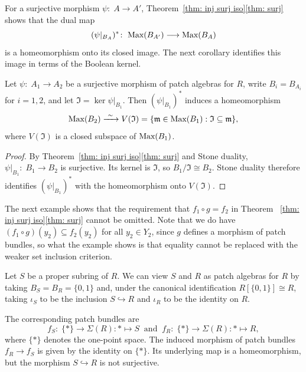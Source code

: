 \documentclass[11pt]{amsart}
\begin{document}
\medskip

For a surjective morphism $\psi\colon\; A\to A'$, Theorem~\ref{thm: inj surj iso}\ref{thm: surj} shows that the dual map
$$(\psi|_{B_A})^*\colon\; \mbox{\rm Max}(B_{A'})\longrightarrow\mbox{\rm Max}(B_A)$$ is a homeomorphism onto
its closed image. The next corollary identifies this image in terms
of the Boolean kernel.


\begin{corollary}\label{cor: Boolean kernel closed subspace}
Let $\psi\colon\; A_1\to A_2$ be a surjective morphism of patch algebras for $R$,
write $B_i=B_{A_i}$ for $i=1,2$, and let
$\mathfrak I=\ker \psi|_{B_1}$.
Then $(\psi|_{B_1})^*$ induces a homeomorphism
\[
\mbox{\rm Max}(B_2)\xrightarrow{\ \sim\ }V(\mathfrak I)
=\{\mathfrak m\in\mbox{\rm Max}(B_1):\mathfrak I\subseteq\mathfrak m\},
\]
where $V(\mathfrak I)$ is a closed subspace of $\mbox{\rm Max}(B_1)$.
\end{corollary}

\begin{proof}
By Theorem~\ref{thm: inj surj iso}\ref{thm: surj} and Stone duality,
$\psi|_{B_1}\colon\; B_1\to B_2$ is surjective. Its kernel is $\mathfrak I$, so
$B_1/\mathfrak I\cong B_2$. Stone duality therefore identifies
$(\psi|_{B_1})^*$ with the homeomorphism onto $V(\mathfrak I)$.
\end{proof}



The next example shows that the requirement that $f_1 \circ g = f_2$ in Theorem~ \ref{thm: inj surj iso}\ref{thm: surj} cannot be omitted. Note that we do have $(f_1 \circ g)(y_2) \subseteq f_2(y_2)$ for all $y_2 \in  Y_2$, since $g$ defines a morphism of patch bundles, so what the example shows is that equality cannot be replaced with the weaker set inclusion criterion.

\begin{example}
Let $S$ be a proper subring of $R$.
We can view $S$ and $R$ as patch algebras for $R$ by taking $B_S=B_R=\{0,1\}$ and, under the canonical identification $R[\{0,1\}]\cong R$, taking $\iota_S$ to be the inclusion $S\hookrightarrow R$ and $\iota_R$ to be the identity on $R$.

The corresponding patch bundles are
\[
f_S\colon\; \{*\}\longrightarrow\Sigma(R): *\longmapsto S
\: \text{ and }\:
f_R\colon\; \{*\}\longrightarrow\Sigma(R): *\longmapsto R,
\]
where $\{*\}$ denotes the one-point space. The induced morphism of patch bundles $f_R\to f_S$ is given by the identity
on $\{*\}$. Its underlying map is a homeomorphism, but the morphism
$S\hookrightarrow R$ is not surjective.
\end{example}
\end{document}
